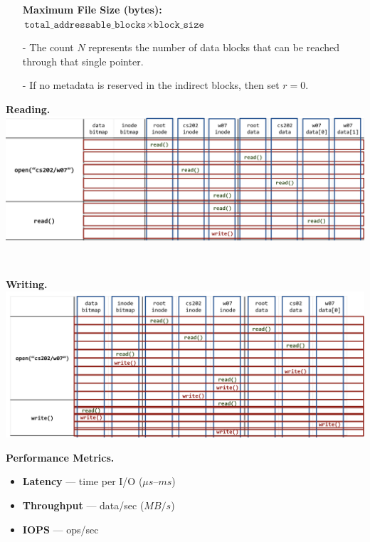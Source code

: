 \documentclass[8pt]{extarticle}
\begin{document}
\begin{minipage}[htp]{0.5\textwidth}
\begin{minipage}[htp]{0.68\textwidth}
\begin{itemize}[noitemsep,nolistsep,topsep=0px,partopsep=0pt,parsep=0pt]
    
    \item[] \textbf{Maximum File Size (bytes):} \\ 
$
    \texttt{total\_addressable\_blocks} \times \texttt{block\_size}
$
    \item[-] The count \(N\) represents the number of data blocks that can be reached through that single pointer.
    \item[-] If no metadata is reserved in the indirect blocks, then set \(r = 0\).
\end{itemize}
\end{minipage}
\begin{minipage}[htp]{1\textwidth}
    \noindent\textbf{Reading.}\\
    \includegraphics[width=1\textwidth]{images/read.png}
\end{minipage}\\
\begin{minipage}[htp]{1\textwidth}
    \noindent\textbf{Writing.}\\
    \includegraphics[width=1\textwidth]{images/write.png}
\end{minipage}
\end{minipage}
\newpage
\noindent\textbf{Performance Metrics.}
\begin{itemize}[noitemsep,nolistsep,topsep=0px,partopsep=0pt,parsep=0pt]  
    \item \textbf{Latency} — time per I/O ($\mu s$–$ms$)
    \item \textbf{Throughput} — data/sec ($MB/s$)
    \item \textbf{IOPS} — ops/sec
\end{itemize}
\end{document}
